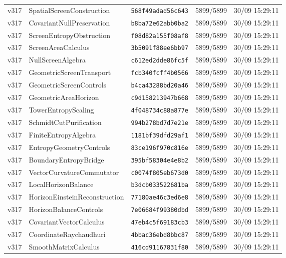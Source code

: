 \documentclass[11pt]{article}
\theoremstyle{definition}\newtheorem{deriv}{Derivação}
\begin{document}
{\begin{longtable}{@{}lllll@{}}
v317 & SpatialScreenConstruction & \texttt{568f49adad56c643} & 5899/5899 & 30/09 15:29:11 \\
v317 & CovariantNullPreservation & \texttt{b8ba72e62abb0ba2} & 5899/5899 & 30/09 15:29:11 \\
v317 & ScreenEntropyObstruction & \texttt{f08d82a155f08af8} & 5899/5899 & 30/09 15:29:11 \\
v317 & ScreenAreaCalculus & \texttt{3b5091f88ee6bb97} & 5899/5899 & 30/09 15:29:11 \\
v317 & NullScreenAlgebra & \texttt{c612ed2dde86fc5f} & 5899/5899 & 30/09 15:29:11 \\
v317 & GeometricScreenTransport & \texttt{fcb340fcff4b0566} & 5899/5899 & 30/09 15:29:11 \\
v317 & GeometricScreenControls & \texttt{b4ca43288bd20a46} & 5899/5899 & 30/09 15:29:11 \\
v317 & GeometricAreaHorizon & \texttt{c9d158213947b668} & 5899/5899 & 30/09 15:29:11 \\
v317 & TowerEntropyScaling & \texttt{4f048734c88a877e} & 5899/5899 & 30/09 15:29:11 \\
v317 & SchmidtCutPurification & \texttt{994b278bd7d7e21e} & 5899/5899 & 30/09 15:29:11 \\
v317 & FiniteEntropyAlgebra & \texttt{1181bf39dfd29af1} & 5899/5899 & 30/09 15:29:11 \\
v317 & EntropyGeometryControls & \texttt{83ce196f970c816e} & 5899/5899 & 30/09 15:29:11 \\
v317 & BoundaryEntropyBridge & \texttt{395bf58304e4e8b2} & 5899/5899 & 30/09 15:29:11 \\
v317 & VectorCurvatureCommutator & \texttt{c0074f805eb673d0} & 5899/5899 & 30/09 15:29:11 \\
v317 & LocalHorizonBalance & \texttt{b3dcb033522681ba} & 5899/5899 & 30/09 15:29:11 \\
v317 & HorizonEinsteinReconstruction & \texttt{77180ae46c3ed6e8} & 5899/5899 & 30/09 15:29:11 \\
v317 & HorizonBalanceControls & \texttt{7e06684f99380dbd} & 5899/5899 & 30/09 15:29:11 \\
v317 & CovariantVectorCalculus & \texttt{47eb4c5f69183cb3} & 5899/5899 & 30/09 15:29:11 \\
v317 & CoordinateRaychaudhuri & \texttt{4bbac36ebd8bbc87} & 5899/5899 & 30/09 15:29:11 \\
v317 & SmoothMatrixCalculus & \texttt{416cd91167831f80} & 5899/5899 & 30/09 15:29:11 \\

\end{longtable}}
\end{document}
